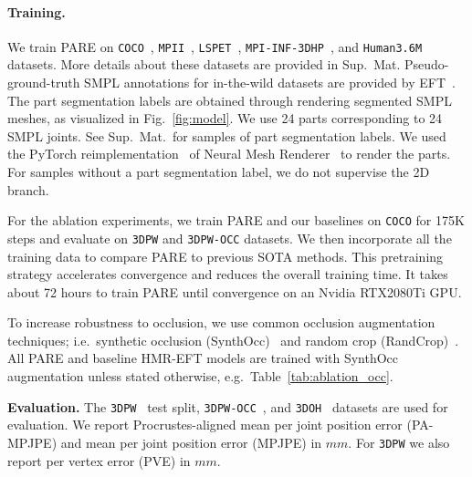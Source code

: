 \documentclass[10pt,twocolumn,letterpaper,usenames,dvipsnames]{article}
\newcommand{\methodname}{PARE\xspace}
\newcommand{\mpi}{\texttt{MPI-INF-3DHP}\xspace}
\newcommand{\mpii}{\texttt{MPII}\xspace}
\newcommand{\lspet}{\texttt{LSPET}\xspace}
\newcommand{\hthreesixm}{\texttt{Human3.6M}\xspace}
\newcommand{\threedpw}{\texttt{3DPW}\xspace}
\newcommand{\threedpwocc}{\texttt{3DPW-OCC}\xspace}
\newcommand{\coco}{\texttt{COCO}\xspace}
\newcommand{\ooh}{\texttt{3DOH}\xspace}
\newcommand{\supmat}{Sup.~Mat.\xspace}
\renewcommand{\ie}{i.e.\xspace}
\renewcommand{\eg}{e.g.\xspace}
\begin{document}
\paragraph{Training.} 
We train \methodname on \coco~\cite{coco}, \mpii~\cite{mpii}, \lspet~\cite{lspet}, \mpi~\cite{mpiiinf3dhp_mono-2017}, and \hthreesixm~\cite{ionescu_h36m} datasets. More details about these datasets are provided in \supmat Pseudo-ground-truth SMPL annotations for in-the-wild datasets are provided by EFT~\cite{joo2020eft}. 
The part segmentation labels are obtained through rendering segmented SMPL meshes, as visualized in Fig.~\ref{fig:model}. We use 24 parts corresponding to 24 SMPL joints. See \supmat~for samples of part segmentation labels. We used the PyTorch reimplementation~\cite{kolotouros2018pytorch} of Neural Mesh Renderer~\cite{kato2018renderer} to render the parts. For samples without a part segmentation label, we do not supervise the 2D branch.

For the ablation experiments, we train PARE and our baselines on \coco for 175K steps and evaluate on \threedpw and \threedpwocc datasets. We then incorporate all the training data to compare PARE to previous SOTA methods. This pretraining strategy accelerates convergence and reduces the overall training time. It takes about 72 hours to train PARE until convergence on an Nvidia RTX2080Ti GPU. 

To increase robustness to occlusion, we use common occlusion augmentation techniques; \ie~synthetic occlusion (SynthOcc)~\cite{sarandi2018robust} and random crop (RandCrop)~\cite{joo2020eft, Rockwell2020}. All PARE and baseline HMR-EFT models are trained with SynthOcc augmentation unless stated otherwise, \eg~Table~\ref{tab:ablation_occ}.

\noindent
\textbf{Evaluation.} The \threedpw~\cite{vonMarcard2018_3dpw} test split, \threedpwocc~\cite{vonMarcard2018_3dpw, zhangoohcvpr20}, and \ooh~\cite{zhangoohcvpr20} datasets are used for evaluation. We report Procrustes-aligned mean per joint position error (PA-MPJPE) and mean  per  joint position error (MPJPE) in $mm$. For \threedpw we also report per vertex error (PVE) in $mm$.
\end{document}
